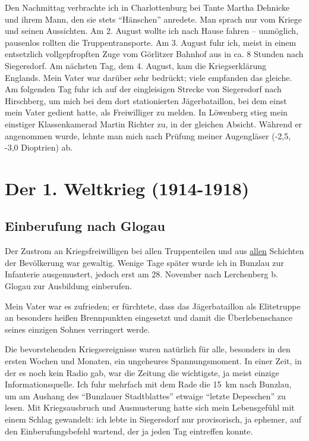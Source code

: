 \documentclass[a5paper,pagesize,10pt,twoside=true]{scrbook}
\renewcommand{\marginpar}[2][]{}
\begin{document}
Den Nachmittag verbrachte ich in Charlottenburg bei Tante Martha Dehnicke und ihrem Mann, den sie stets \enquote{Hänschen} anredete. Man sprach nur vom Kriege und seinen Aussichten. Am 2. August wollte ich nach Hause fahren -- unmöglich, pausenlos rollten die Truppentransporte. Am 3. August fuhr ich, meist in einem entsetzlich vollgepfropften Zuge vom Görlitzer Bahnhof aus in ca. 8 Stunden nach Siegersdorf. Am nächsten Tag, dem 4. August, kam die Kriegserklärung Englands. Mein Vater war darüber sehr bedrückt; viele empfanden das gleiche. Am folgenden Tag fuhr ich auf der eingleisigen Strecke von Siegersdorf nach Hirschberg, um mich bei dem dort stationierten Jägerbataillon, bei dem einst mein Vater gedient hatte, als Freiwilliger zu melden. In Löwenberg stieg mein einstiger Klassenkamerad Martin Richter zu, in der gleichen Absicht. Während er angenommen wurde, lehnte man mich nach Prüfung meiner Augengläser (-2,5, -3,0 Dioptrien) ab.


\chapter{Der 1. Weltkrieg (1914-1918)}
\section{Einberufung nach Glogau}

Der Zustrom an Kriegsfreiwilligen bei allen Truppenteilen und aus \underline{allen} Schichten der Bevölkerung war gewaltig. Wenige Tage später wurde ich in Bunzlau zur Infanterie ausgemustert, jedoch erst am 28. November nach Lerchenberg b. Glogau zur Ausbildung einberufen.

Mein Vater war es zufrieden; er fürchtete, dass das Jägerbataillon als Elitetruppe an besonders heißen Brennpunkten eingesetzt und damit die Überlebenschance seines einzigen Sohnes verringert werde.

Die bevorstehenden Kriegsereignisse waren natürlich für alle, besonders in den ersten Wochen und Monaten, ein ungeheures Spannungsmoment. In einer Zeit, in der es noch \marginpar{174}kein Radio gab, war die Zeitung die wichtigste, ja meist einzige Informationsquelle. Ich fuhr mehrfach mit dem Rade die 15~km nach Bunzlau, um am Aushang des \enquote{Bunzlauer Stadtblattes} etwaige \enquote{letzte Depeschen} zu lesen. Mit Kriegsausbruch und Ausmusterung hatte sich mein Lebensgefühl mit einem Schlag gewandelt: ich lebte in Siegersdorf nur provisorisch, ja ephemer, auf den Einberufungsbefehl wartend, der ja jeden Tag eintreffen konnte.
\end{document}
